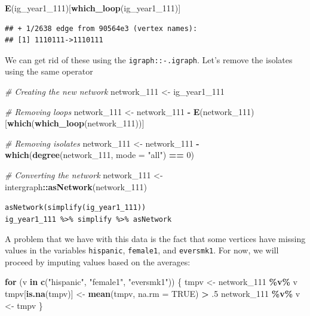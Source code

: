 \documentclass[
]{book}
\newenvironment{Shaded}{\begin{snugshade}}{\end{snugshade}}
\newcommand{\AttributeTok}[1]{\textcolor[rgb]{0.13,0.29,0.53}{#1}}
\newcommand{\CommentTok}[1]{\textcolor[rgb]{0.56,0.35,0.01}{\textit{#1}}}
\newcommand{\ConstantTok}[1]{\textcolor[rgb]{0.56,0.35,0.01}{#1}}
\newcommand{\ControlFlowTok}[1]{\textcolor[rgb]{0.13,0.29,0.53}{\textbf{#1}}}
\newcommand{\DecValTok}[1]{\textcolor[rgb]{0.00,0.00,0.81}{#1}}
\newcommand{\FunctionTok}[1]{\textcolor[rgb]{0.13,0.29,0.53}{\textbf{#1}}}
\newcommand{\NormalTok}[1]{#1}
\newcommand{\OtherTok}[1]{\textcolor[rgb]{0.56,0.35,0.01}{#1}}
\newcommand{\SpecialCharTok}[1]{\textcolor[rgb]{0.81,0.36,0.00}{\textbf{#1}}}
\newcommand{\StringTok}[1]{\textcolor[rgb]{0.31,0.60,0.02}{#1}}
\begin{document}
\begin{Shaded}
\begin{Highlighting}[]
\FunctionTok{E}\NormalTok{(ig\_year1\_111)[}\FunctionTok{which\_loop}\NormalTok{(ig\_year1\_111)]}
\end{Highlighting}
\end{Shaded}

\begin{verbatim}
## + 1/2638 edge from 90564e3 (vertex names):
## [1] 1110111->1110111
\end{verbatim}

We can get rid of these using the \texttt{igraph::-.igraph}. Let's remove the isolates using the same operator

\begin{Shaded}
\begin{Highlighting}[]
\CommentTok{\# Creating the new network}
\NormalTok{network\_111 }\OtherTok{\textless{}{-}}\NormalTok{ ig\_year1\_111}

\CommentTok{\# Removing loops}
\NormalTok{network\_111 }\OtherTok{\textless{}{-}}\NormalTok{ network\_111 }\SpecialCharTok{{-}} \FunctionTok{E}\NormalTok{(network\_111)[}\FunctionTok{which}\NormalTok{(}\FunctionTok{which\_loop}\NormalTok{(network\_111))]}

\CommentTok{\# Removing isolates}
\NormalTok{network\_111 }\OtherTok{\textless{}{-}}\NormalTok{ network\_111 }\SpecialCharTok{{-}} \FunctionTok{which}\NormalTok{(}\FunctionTok{degree}\NormalTok{(network\_111, }\AttributeTok{mode =} \StringTok{"all"}\NormalTok{) }\SpecialCharTok{==} \DecValTok{0}\NormalTok{)}

\CommentTok{\# Converting the network}
\NormalTok{network\_111 }\OtherTok{\textless{}{-}}\NormalTok{ intergraph}\SpecialCharTok{::}\FunctionTok{asNetwork}\NormalTok{(network\_111)}
\end{Highlighting}
\end{Shaded}

\texttt{asNetwork(simplify(ig\_year1\_111))}
\texttt{ig\_year1\_111\ \%\textgreater{}\%\ simplify\ \%\textgreater{}\%\ asNetwork}

A problem that we have with this data is the fact that some vertices have missing values in the variables \texttt{hispanic}, \texttt{female1}, and \texttt{eversmk1}. For now, we will proceed by imputing values based on the averages:

\begin{Shaded}
\begin{Highlighting}[]
\ControlFlowTok{for}\NormalTok{ (v }\ControlFlowTok{in} \FunctionTok{c}\NormalTok{(}\StringTok{"hispanic"}\NormalTok{, }\StringTok{"female1"}\NormalTok{, }\StringTok{"eversmk1"}\NormalTok{)) \{}
\NormalTok{  tmpv }\OtherTok{\textless{}{-}}\NormalTok{ network\_111 }\SpecialCharTok{\%v\%}\NormalTok{ v}
\NormalTok{  tmpv[}\FunctionTok{is.na}\NormalTok{(tmpv)] }\OtherTok{\textless{}{-}} \FunctionTok{mean}\NormalTok{(tmpv, }\AttributeTok{na.rm =} \ConstantTok{TRUE}\NormalTok{) }\SpecialCharTok{\textgreater{}}\NormalTok{ .}\DecValTok{5}
\NormalTok{  network\_111 }\SpecialCharTok{\%v\%}\NormalTok{ v }\OtherTok{\textless{}{-}}\NormalTok{ tmpv}
\NormalTok{\}}
\end{Highlighting}
\end{Shaded}
\end{document}
